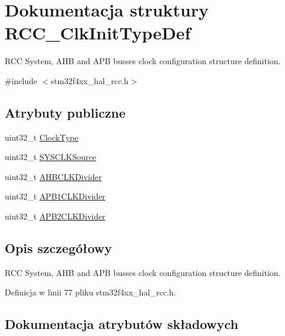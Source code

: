 \hypertarget{struct_r_c_c___clk_init_type_def}{}\section{Dokumentacja struktury R\+C\+C\+\_\+\+Clk\+Init\+Type\+Def}
\label{struct_r_c_c___clk_init_type_def}


R\+CC System, A\+HB and A\+PB busses clock configuration structure definition.  




{\ttfamily \#include $<$stm32f4xx\+\_\+hal\+\_\+rcc.\+h$>$}

\subsection*{Atrybuty publiczne}
\begin{DoxyCompactItemize}
\item 
uint32\+\_\+t \hyperlink{struct_r_c_c___clk_init_type_def_a93a53676a1cfc5b55b8b990e7ff4dac5}{Clock\+Type}
\item 
uint32\+\_\+t \hyperlink{struct_r_c_c___clk_init_type_def_a4ceff1fdbf423e347c63052ca2c1d7e1}{S\+Y\+S\+C\+L\+K\+Source}
\item 
uint32\+\_\+t \hyperlink{struct_r_c_c___clk_init_type_def_abd9bcaa8dcf4b816462ee2930ab3e993}{A\+H\+B\+C\+L\+K\+Divider}
\item 
uint32\+\_\+t \hyperlink{struct_r_c_c___clk_init_type_def_a21ceb024102adc3c4dc7eb270cf02ebd}{A\+P\+B1\+C\+L\+K\+Divider}
\item 
uint32\+\_\+t \hyperlink{struct_r_c_c___clk_init_type_def_aa75c110cd93855d49249f38da8cf94f7}{A\+P\+B2\+C\+L\+K\+Divider}
\end{DoxyCompactItemize}


\subsection{Opis szczegółowy}
R\+CC System, A\+HB and A\+PB busses clock configuration structure definition. 

Definicja w linii 77 pliku stm32f4xx\+\_\+hal\+\_\+rcc.\+h.



\subsection{Dokumentacja atrybutów składowych}
\mbox{\label{struct_r_c_c___clk_init_type_def_abd9bcaa8dcf4b816462ee2930ab3e993}} 
